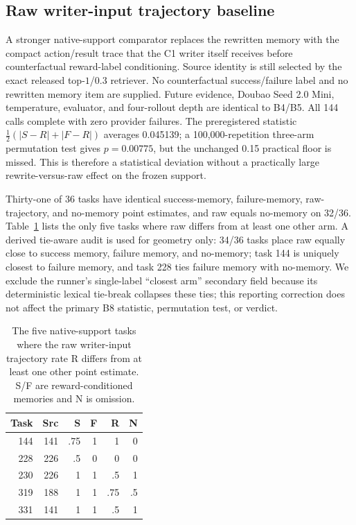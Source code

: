 \subsection{Raw writer-input trajectory baseline}
A stronger native-support comparator replaces the rewritten memory with the compact action/result trace that the C1 writer itself receives before counterfactual reward-label conditioning. Source identity is still selected by the exact released top-$1$/0.3 retriever. No counterfactual success/failure label and no rewritten memory item are supplied. Future evidence, Doubao Seed 2.0 Mini, temperature, evaluator, and four-rollout depth are identical to B4/B5. All 144 calls complete with zero provider failures. The preregistered statistic $\frac12(|S-R|+|F-R|)$ averages 0.045139; a 100,000-repetition three-arm permutation test gives $p=0.00775$, but the unchanged 0.15 practical floor is missed. This is therefore a statistical deviation without a practically large rewrite-versus-raw effect on the frozen support.

Thirty-one of 36 tasks have identical success-memory, failure-memory, raw-trajectory, and no-memory point estimates, and raw equals no-memory on 32/36. Table~\ref{tab:raw-nontrivial} lists the only five tasks where raw differs from at least one other arm. A derived tie-aware audit is used for geometry only: 34/36 tasks place raw equally close to success memory, failure memory, and no-memory; task 144 is uniquely closest to failure memory, and task 228 ties failure memory with no-memory. We exclude the runner's single-label ``closest arm'' secondary field because its deterministic lexical tie-break collapses these ties; this reporting correction does not affect the primary B8 statistic, permutation test, or verdict.

\begin{table}[h]
\centering
\small
\caption{The five native-support tasks where the raw writer-input trajectory rate R differs from at least one other point estimate. S/F are reward-conditioned memories and N is omission.}
\label{tab:raw-nontrivial}
\begin{tabular}{rrrrrr}
\toprule
Task & Src & S & F & R & N \\
\midrule
144 & 141 & .75 & 1 & 1 & 0 \\
228 & 226 & .5 & 0 & 0 & 0 \\
230 & 226 & 1 & 1 & .5 & 1 \\
319 & 188 & 1 & 1 & .75 & .5 \\
331 & 141 & 1 & 1 & .5 & 1 \\
\bottomrule
\end{tabular}
\end{table}

